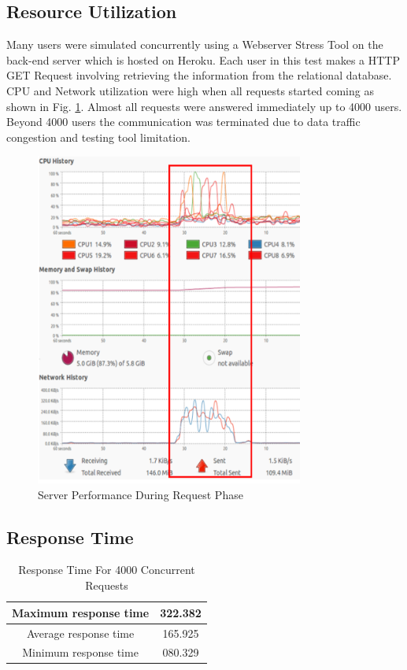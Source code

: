 \documentclass[conference]{IEEEtran}
\begin{document}
\subsection{Resource Utilization}

Many users were simulated concurrently using a Webserver Stress Tool on the back-end server which is hosted on Heroku. Each user in this test makes a HTTP GET Request involving retrieving the information from the relational database. CPU and Network utilization were high when all requests started coming as shown in Fig. \ref{rsc}. Almost all requests were answered immediately up to 4000 users. Beyond 4000 users the communication was terminated due to data traffic congestion and testing tool limitation.

\begin{figure}[htbp]
\centering
\includegraphics[width=250pt]{rsc.png}
\caption{Server Performance During Request Phase}
\label{rsc}
\end{figure}

\subsection{Response Time}

\begin{table}[htbp]
\centering
\caption{Response Time For 4000 Concurrent Requests}
\label{http}
\begin{tabular}{|c|c|}
\hline
Maximum response time & 322.382 \\ \hline
Average response time & 165.925 \\ \hline
Minimum response time & 080.329 \\ \hline
\end{tabular}
\end{table}
\end{document}
